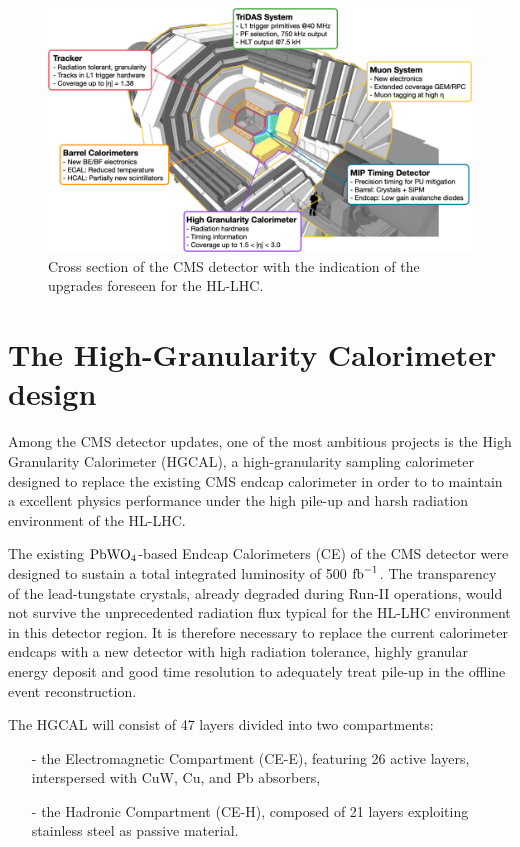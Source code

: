 \begin{figure}
    \centering
    \includegraphics[width=0.95\linewidth]{Figures/HGCAL/CMSUpgrades.pdf}
    \caption{Cross section of the CMS detector with the indication of the upgrades foreseen for the HL-LHC.}
    \label{fig:CMSUpgrade}
\end{figure}

\section{The High-Granularity Calorimeter design}
\label{sec:The High-Granularity Calorimeter design}

Among the CMS detector updates, one of the most ambitious projects is the High Granularity Calorimeter (HGCAL), a high-granularity sampling calorimeter designed to replace the existing CMS endcap calorimeter in order to to maintain a excellent physics performance under the high pile-up and harsh radiation environment of the HL-LHC.

The existing $\textnormal{PbWO}_4$-based Endcap Calorimeters (CE) of the CMS detector were designed to sustain a total integrated luminosity of 500 $\textnormal{fb}^{-1}$. 
The transparency of the lead-tungstate crystals, already degraded during Run-II operations, would not survive the unprecedented radiation flux typical for the HL-LHC environment in this detector region.
It is therefore necessary to replace the current calorimeter endcaps with a new detector with high radiation tolerance, highly granular energy deposit and good time resolution to adequately treat pile-up in the offline event reconstruction. \newline

The HGCAL will consist of 47 layers divided into two compartments:
\begin{itemize}
    \item [-] the Electromagnetic Compartment (CE-E), featuring 26 active layers, interspersed with CuW, Cu, and Pb absorbers,
    \item [-] the Hadronic Compartment (CE-H), composed of 21 layers exploiting stainless steel as passive material.
\end{itemize}

